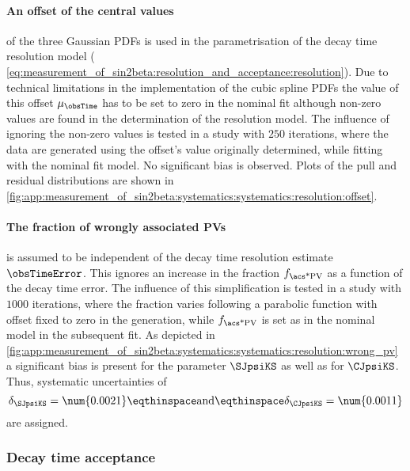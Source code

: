 \paragraph{An offset of the central values} of the three Gaussian \acp{PDF} is
used in the parametrisation of the decay time resolution model (\cf
\cref{eq:measurement_of_sin2beta:resolution_and_acceptance:resolution}). Due to
technical limitations in the implementation of the cubic spline \acp{PDF} the
value of this offset $\mu_{\obsTime}$ has to be set to zero in the nominal fit
although non-zero values are found in the determination of the resolution model.
The influence of ignoring the non-zero values is tested in a \ToyMC study with
$\num{250}$ iterations, where the data are generated using the offset's value
originally determined, while fitting with the nominal fit model. No significant
bias is observed. Plots of the pull and residual distributions are shown in
\cref{fig:app:measurement_of_sin2beta:systematics:systematics:resolution:offset}.

\paragraph{The fraction of wrongly associated \acp{PV}} is assumed to be
independent of the decay time resolution estimate $\obsTimeError$. This ignores
an increase in the fraction $f_\text{\acs*{PV}}$ as a function of the decay time
error. The influence of this simplification is tested in a \ToyMC study with
$\num{1000}$ iterations, where the fraction varies following a parabolic
function with offset fixed to zero in the generation, while $f_\text{\acs*{PV}}$
is set as in the nominal model in the subsequent fit. As depicted in
\cref{fig:app:measurement_of_sin2beta:systematics:systematics:resolution:wrong_pv} 
a significant bias is present for the parameter $\SJpsiKS$ as well as for
$\CJpsiKS$. Thus, systematic uncertainties of
%
\begin{equation}
  \delta_{\SJpsiKS} = \num{0.0021}\eqthinspace\text{and}\eqthinspace\delta_{\CJpsiKS} = \num{0.0011}
\end{equation}
%
are assigned.

\subsubsection{Decay time acceptance}
\label{sec:measurement_of_sin2beta:systematics:systematics:acceptance}

